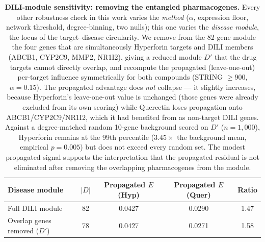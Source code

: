 \begin{table}[ht]
\centering
\caption{\textbf{DILI-module sensitivity: removing the entangled pharmacogenes.} Every other robustness check in this work varies the \emph{method} ($\alpha$, expression floor, network threshold, degree-binning, two nulls); this one varies the \emph{disease module}, the locus of the target--disease circularity. We remove from the 82-gene module the four genes that are simultaneously Hyperforin targets and DILI members (ABCB1, CYP2C9, MMP2, NR1I2), giving a reduced module $D'$ that the drug targets cannot directly overlap, and recompute the propagated (leave-one-out) per-target influence symmetrically for both compounds (STRING $\geq$900, $\alpha=0.15$). The propagated advantage does \emph{not} collapse --- it slightly increases, because Hyperforin's leave-one-out value is unchanged (those genes were already excluded from its own scoring) while Quercetin loses propagation onto ABCB1/CYP2C9/NR1I2, which it had benefited from as non-target DILI genes. Against a degree-matched random 10-gene background scored on $D'$ ($n=1{,}000$), Hyperforin remains at the 99th percentile ($3.45\times$ the background mean, empirical $p=0.005$) but does not exceed every random set. The modest propagated signal supports the interpretation that the propagated residual is not eliminated after removing the overlapping pharmacogenes from the module.}
\label{tab:s_modulesens}
\begin{tabular}{@{}l S[table-format=2.0] S[table-format=1.4] S[table-format=1.4] S[table-format=1.2]@{}}
\toprule
\textbf{Disease module} & {$|D|$} & {Propagated $E$ (Hyp)} & {Propagated $E$ (Quer)} & {Ratio} \\
\midrule
Full DILI module            & 82 & 0.0427 & 0.0290 & 1.47 \\
Overlap genes removed ($D'$) & 78 & 0.0427 & 0.0271 & 1.58 \\
\bottomrule
\end{tabular}
\end{table}

